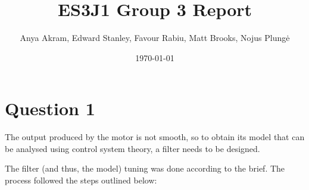 \documentclass[11pt, onecolumn]{article}
\title{ES3J1 Group 3 Report}
\author{Anya Akram, Edward Stanley, Favour Rabiu, Matt Brooks, Nojus Plungė}
\date{\today}
\begin{document}
\setlength{\abovecaptionskip}{5pt plus 3pt minus 2pt}
\setlength{\parindent}{0.5em}
\setlength{\belowcaptionskip}{-8pt}
\setlength{\belowdisplayskip}{8pt}
\maketitle

\section*{Question 1}
\par The output produced by the motor is not smooth, so to obtain its model that can be analysed using control system theory, a filter needs to be designed.
\par The filter (and thus, the model) tuning was done according to the brief. The process followed the steps outlined below:
\end{document}
